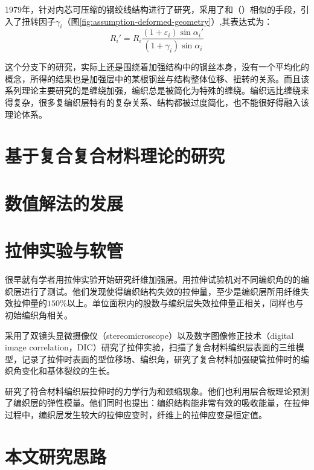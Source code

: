 1979年，\citeauthor{Knapp1979}\cite{Knapp1979}针对内芯可压缩的钢绞线结构进行了研究，采用了和\citeauthor{machida1973}（\citeyear{machida1973}）相似的手段，引入了扭转因子$ \gamma_i $（图\ref{fig:assumption-deformed-geometry}）,其表达式为：
\begin{equation}
{R_i}' = {R_i}\frac{{\left( {1 + {\varepsilon _i}} \right)\sin {\alpha _i}'}}{{\left( {1 + {\gamma _i}} \right)\sin {\alpha _i}}}
\end{equation}

这个分支下的研究，实际上还是围绕着加强结构中的钢丝本身，没有一个平均化的概念，所得的结果也是加强层中的某根钢丝与结构整体位移、扭转的关系。而且该系列理论主要研究的是缠绕加强，编织总是被简化为特殊的缠绕。编织远比缠绕来得复杂，很多复编织层特有的复杂关系、结构都被过度简化，也不能很好得融入该理论体系。

\section{基于复合复合材料理论的研究}














\section{数值解法的发展}




\section{拉伸实验与软管}


很早就有学者用拉伸实验开始研究纤维加强层。\citeauthor{brunnschweiler19545}\cite{brunnschweiler19545}用拉伸试验机对不同编织角的的编织层进行了测试。他们发现使得编织结构失效的拉伸量，至少是编织层所用纤维失效拉伸量的$ 150\% $以上。单位面积内的股数与编织层失效拉伸量正相关，同样也与初始编织角相关。


\cite{Hajrasouliha1}



\citeauthor{Leung2013}\cite{Leung2013}


采用了双镜头显微摄像仪（stereomicroscope）以及数字图像修正技术（digital image correlation，DIC）研究了拉伸实验，扫描了复合材料编织层表面的三维模型，记录了拉伸时表面的型位移场、编织角，研究了复合材料加强硬管拉伸时的编织角变化和基体裂纹的生长。

\citeauthor{Harte20001259}\cite{Harte20001259,Harte2000259}研究了符合材料编织层拉伸时的力学行为和颈缩现象。他们也利用层合板理论预测了编织层的弹性模量。他们同时也提出：编织结构能非常有效的吸收能量，在拉伸过程中，编织层发生较大的拉伸应变时，纤维上的拉伸应变是恒定值。



\section{本文研究思路}